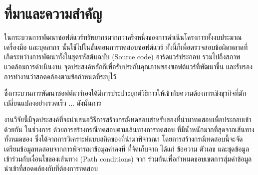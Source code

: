 \section{ที่มาและความสำคัญ} 

ในกระบวนการพัฒนาซอฟต์แวร์ทรัพยากรมากกว่าครึ่งหนึ่งของการดำเนินโครงการทั้งงบประมาณ เครื่องมือ และบุคลากร นั้นใช้ไปในขั้นตอนการทดสอบซอฟต์แวร์ %
ทั้งนี้ก็เพื่อตรวจสอบข้อผิดพลาดที่เกิดระหว่างการพัฒนาทั้งในชุดรหัสต้นฉบับ (Source code) ฮาร์ดแวร์ประกอบ รวมไปถึงสภาพแวดล้อมการดำเนินงาน 
จุดประสงค์หลักก็เพื่อรับประกันคุณภาพของซอฟต์แวร์ที่พัฒนาขึ้น และรับรองการทำงานว่าสอดคล้องตามข้อกำหนดที่ระบุไว้

ซึ่งกระบวนการพัฒนาซอฟต์แวร์เองได้มีการประประยุกต์วิธีการให้เข้ากับความต้องการเชิงธุรกิจที่มักเปลี่ยนแปลงอย่างรวดเร็ว ... ดังนั้นการ







งานวิจัยนี้มีจุดประสงค์ที่จะนำเสนอวิธีการสร้างกรณีทดสอบสำหรับ{\sourcecode}ของ{\softwareComponent}ที่นำมาทดสอบเพื่อประกอบเข้าด้วยกัน
ในช่วงการ\FirstTimeDefine{\IntegrationTesting}{\IntegrationTestingEN} ด้วยการสร้างกรณีทดสอบตามเส้นทางการทดสอบ
ที่มีน้ำหนักมากที่สุดจากเส้นทางทั้งหมดของ{\scg} ซึ่งได้จากการวิเคราะห์แบบสถิตของ{\sourcecode}ที่นำมาพิจารณา 
โดยการสร้างกรณีทดสอบนี้จะจัดเตรียมข้อมูลทดสอบจากการพิจารณาข้อมูลค่าคงที่ ที่จัดเก็บจาก{\sourcecode} ได้แก่ ข้อความ ตัวเลข และชุดข้อมูล 
เข้าร่วมกับเงื่อนไขของเส้นทาง (Path conditions) จาก{\cfg} ร่วมกันเพื่อกำหนดขอบเขตการสุ่มค่าข้อมูลนำเข้าที่สอดคล้องกับ{\MethodSignature}ที่ต้องการทดสอบ

